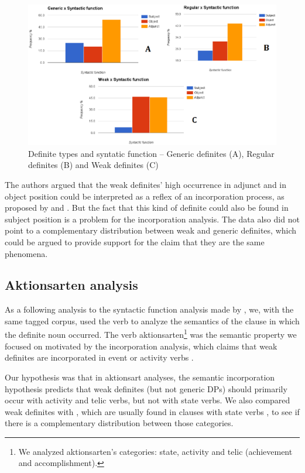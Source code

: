 \documentclass[output=paper,
modfonts
]{langscibook}
\begin{document}
\begin{figure}[H]
\centering
\includegraphics[width=1\textwidth]{figures/fig_tipo_sintaxe}
\caption{Definite types and syntatic function -- Generic definites (A), Regular definites (B) and Weak definites (C) \citep[114, 115]{deSaEtAlii2016}}
\label{fig:desaetal:1}
\end{figure}

The authors argued that the weak definites' high occurrence in adjunct and in object position could be interpreted as a reflex of an incorporation process, as proposed by \citet{CarlsonEtAlii2013} and \citet{KleinEtAlii2013}. But the fact that this kind of definite could also be found in subject position is a problem for the incorporation analysis. The data also did not point to a complementary distribution between weak and generic definites, which could be argued to provide support for the claim that they are the same phenomena.

\subsection{Aktionsarten analysis}

As a following analysis to the syntactic function analysis made by \citet{deSaEtAlii2016}, we, with the same tagged corpus, used the verb to analyze the semantics of the clause in which the definite noun occurred. The verb aktionsarten\footnote{We analyzed \citet{Vendler1957} aktionsarten's categories: state, activity and telic (achievement and accomplishment).} was the semantic property we focused on motivated by the incorporation analysis, which claims that weak definites are incorporated in event or activity verbs \citep{CarlsonEtAlii2013}. 

Our hypothesis was that in aktionsart analyses, the semantic incorporation hypothesis predicts that weak definites (but not generic DPs) should primarily occur with activity and telic verbs, but not with state verbs. We also compared weak definites with , which are usually found in clauses with state verbs \citep{Carlson2006}, to see if there is a complementary distribution between those categories.
\end{document}
